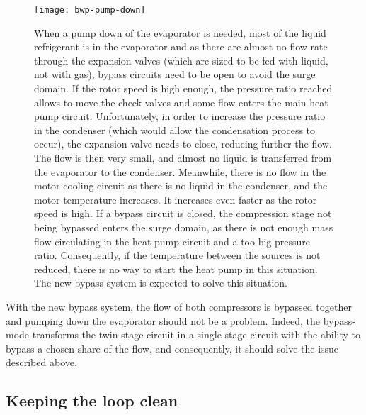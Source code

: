 \begin{figure}
  \centering
  \texttt{[image: bwp-pump-down]}
  \caption[Simplified layout in an evaporator pump down situation]
  {When a pump down of the evaporator is needed, most of the liquid
    refrigerant is in the evaporator and as there are almost no flow
    rate through the expansion valves (which are sized to be fed with
    liquid, not with gas), bypass circuits need to be open to avoid
    the surge domain. If the rotor speed is high enough, the pressure
    ratio reached allows to move the check valves and some flow enters
    the main heat pump circuit. Unfortunately, in order to increase
    the pressure ratio in the condenser (which would allow the
    condensation process to occur), the expansion valve needs to
    close, reducing further the flow. The flow is then very small, and
    almost no liquid is transferred from the evaporator to the
    condenser. Meanwhile, there is no flow in the motor cooling
    circuit as there is no liquid in the condenser, and the motor
    temperature increases. It increases even faster as the rotor speed
    is high. If a bypass circuit is closed, the compression stage not
    being bypassed enters the surge domain, as there is not enough
    mass flow circulating in the heat pump circuit and a too big
    pressure ratio. Consequently, if the temperature between the
    sources is not reduced, there is no way to start the heat pump in
    this situation. The new bypass system is expected to solve this
    situation.}
  \label{fig:bwp-pumpdown-ev}
\end{figure}

With the new \BWP{} bypass system, the flow of both compressors is
bypassed together and pumping down the evaporator should not be a
problem. Indeed, the bypass-mode transforms the twin-stage circuit in
a single-stage circuit with the ability to bypass a chosen share of
the flow, and consequently, it should solve the issue described above.

\subsection{Keeping the loop clean}
\label{sec:awp-issue-oil+corrosion}

